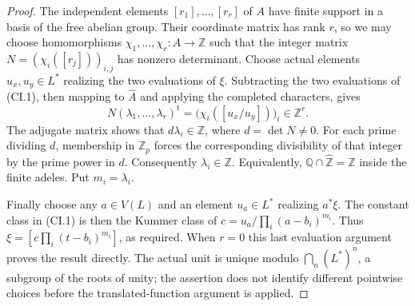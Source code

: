 \begin{proof}
The independent elements $[r_1],\ldots,[r_r]$ of $A$ have finite
support in a basis of the free abelian group. Their coordinate matrix
has rank $r$, so we may choose homomorphisms
$\chi_1,\ldots,\chi_r:A\to\mathbb Z$ such that the integer matrix
$N=(\chi_i([r_j]))_{i,j}$ has nonzero determinant. Choose actual
elements $u_x,u_y\in L^*$ realizing the two evaluations of $\xi$.
Subtracting the two evaluations of (CI.1), then mapping to
$\widehat A$ and applying the completed characters, gives
\[
 N(\lambda_1,\ldots,\lambda_r)^{\mathrm t}
   =\bigl(\chi_i([u_x/u_y])\bigr)_i\in\mathbb Z^r.
                                                        \tag{CI.4}
\]
The adjugate matrix shows that
$d\lambda_i\in\mathbb Z$, where $d=\det N\ne0$.
For each prime dividing $d$, membership in $\mathbb Z_p$ forces the
corresponding divisibility of that integer by the prime power in $d$.
Consequently $\lambda_i\in\mathbb Z$. Equivalently,
$\mathbb Q\cap\widehat{\mathbb Z}=\mathbb Z$ inside the finite
adeles. Put $m_i=\lambda_i$.

Finally choose any $a\in V(L)$ and an element $u_a\in L^*$ realizing
$a^*\xi$. The constant class in (CI.1) is then the Kummer class of
$c=u_a/\prod_i(a-b_i)^{m_i}$. Thus
$\xi=[c\prod_i(t-b_i)^{m_i}]$, as required. When $r=0$ this last
evaluation argument proves the result directly. The actual unit is
unique modulo $\bigcap_n(L^*)^n$, a subgroup of the roots of unity;
the assertion does not identify different pointwise choices before
the translated-function argument is applied.
\end{proof}
